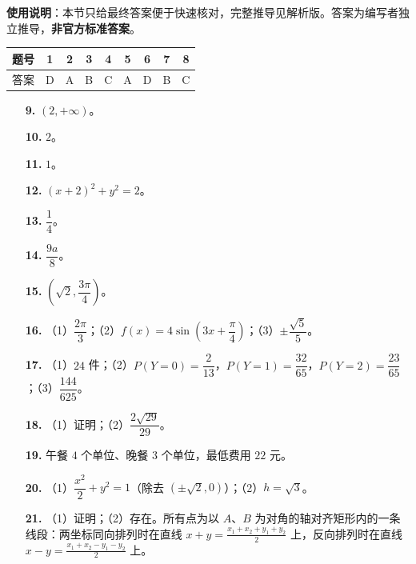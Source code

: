 
\begin{gknotice}
\textbf{使用说明}：本节只给最终答案便于快速核对，完整推导见解析版。答案为编写者独立推导，\textbf{非官方标准答案}。
\end{gknotice}

\begin{center}\begin{tabular}{ccccccccc}
\toprule
题号 & 1 & 2 & 3 & 4 & 5 & 6 & 7 & 8 \\
\midrule
答案 & D & A & B & C & A & D & B & C \\
\bottomrule
\end{tabular}\end{center}

\begin{itemize}[leftmargin=2.6em]
  \item[\textbf{9.}] $(2,+\infty)$。
  \item[\textbf{10.}] $2$。
  \item[\textbf{11.}] $1$。
  \item[\textbf{12.}] $(x+2)^2+y^2=2$。
  \item[\textbf{13.}] $\dfrac14$。
  \item[\textbf{14.}] $\dfrac{9a}8$。
  \item[\textbf{15.}] $\left(\sqrt2,\dfrac{3\pi}4\right)$。
\end{itemize}

\begin{itemize}[leftmargin=2.6em]
  \item[\textbf{16.}] （1）$\dfrac{2\pi}3$；（2）$f(x)=4\sin\left(3x+\dfrac\pi4\right)$；（3）$\pm\dfrac{\sqrt5}5$。
  \item[\textbf{17.}] （1）$24$ 件；（2）$P(Y=0)=\dfrac2{13}$，$P(Y=1)=\dfrac{32}{65}$，$P(Y=2)=\dfrac{23}{65}$；（3）$\dfrac{144}{625}$。
  \item[\textbf{18.}] （1）证明；（2）$\dfrac{2\sqrt{29}}{29}$。
  \item[\textbf{19.}] 午餐 $4$ 个单位、晚餐 $3$ 个单位，最低费用 $22$ 元。
  \item[\textbf{20.}] （1）$\dfrac{x^2}{2}+y^2=1$（除去 $(\pm\sqrt2,0)$）；（2）$h=\sqrt3$。
  \item[\textbf{21.}] （1）证明；（2）存在。所有点为以 $A$、$B$ 为对角的轴对齐矩形内的一条线段：两坐标同向排列时在直线 $x+y=\frac{x_1+x_2+y_1+y_2}{2}$ 上，反向排列时在直线 $x-y=\frac{x_1+x_2-y_1-y_2}{2}$ 上。
\end{itemize}
